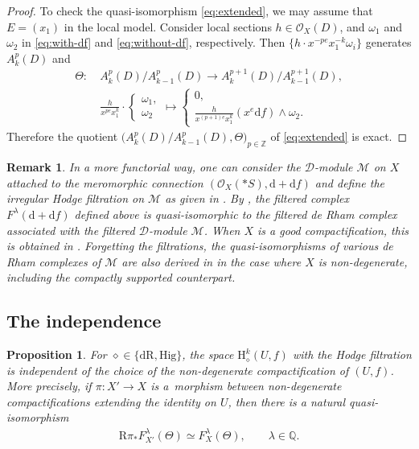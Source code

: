 \documentclass[11pt]{article}
\newcommand{\QQ}{\mathbb{Q}}
\newcommand{\ZZ}{\mathbb{Z}}
\newcommand{\sD}{\mathscr{D}}
\newcommand{\sM}{\mathscr{M}}
\newcommand{\sO}{\mathscr{O}}
\newcommand{\de}{\mathrm{d}}
\newcommand{\dR}{\mathrm{dR}}
\newcommand{\Hig}{\mathrm{Hig}}
\newcommand{\coH}{\mathrm{H}}
\newcommand{\dRH}{\diamond}
\newcommand{\ddRH}{\Theta}
\newcommand{\cpt}{compactification}
\newcommand{\RD}{\mathrm{R}}
\newtheorem*{proposition*}{Proposition}
\newtheorem*{remark*}{Remark}
\begin{document}
\begin{proof}
To check the quasi-isomorphism \eqref{eq:extended}, we may assume that $E = (x_1)$ in the local model. Consider local sections $h\in\sO_X(D)$, and $\omega_1$ and $\omega_2$ in \eqref{eq:with-df} and \eqref{eq:without-df},
respectively. Then $\big\{h\cdot x^{-pe}x_1^{-k}\omega_i\big\}$ generates $A_k^p(D)$ and
\begin{align*}
\ddRH\colon \ & A_k^p(D)/A_{k-1}^p(D) \to A_k^{p+1}(D)/A_{k-1}^{p+1}(D), \\
& \frac{h}{x^{pe}x_1^k}\cdot \begin{cases}
\omega_1, \\ \omega_2
\end{cases}
 \mapsto \begin{cases}
0, \\
\frac{h}{x^{(p+1)e} x_1^k} (x^e\de f)\wedge\omega_2.
\end{cases}
\end{align*}
Therefore the quotient $\big(A_k^p(D)/A_{k-1}^p(D),\ddRH\big)_{p\in\ZZ}$ of \eqref{eq:extended} is exact.
\end{proof}

\begin{remark*} In a more functorial way, one can consider the $\sD$-module $\sM$ on $X$ attached to the meromorphic connection $(\sO_X(*S),\de +\de f)$ and define the \textit{irregular Hodge filtration} on $\sM$ as given in \cite[Definition~5.1]{SY}. By \cite[Lemma~9.17]{SY}, the filtered complex $F^\lambda(\de +\de f)$ defined above is quasi-isomorphic to the filtered de Rham complex associated with the filtered $\sD$-module $\sM$. When $X$ is a good {\cpt}, this is obtained in \cite[Proposition~1.7.4]{ESY}. Forgetting the filtrations, the quasi-isomorphisms of various de Rham complexes of $\sM$ are also derived in \cite[Lemmas 2.13 and 2.15]{M_GKZ} in the case where $X$ is non-degenerate, including the compactly supported counterpart.
\end{remark*}

\subsection{The independence}
\begin{proposition*}
For $\dRH \in \{\dR,\Hig\}$, the space $\coH_\dRH^k(U,f)$ with the Hodge filtration is independent of the choice of the non-degenerate {\cpt} of $(U,f)$. More precisely, if $\pi\colon X' \to X$ is a~morphism between non-degenerate {\cpt}s extending the identity on $U$, then there is a natural quasi-isomorphism
\begin{gather}\label{eq:RpiF}
\RD\pi_* F^\lambda_{X'}(\ddRH) \simeq F^\lambda_X(\ddRH), \qquad \lambda\in\QQ.
\end{gather}
\end{proposition*}
\end{document}
